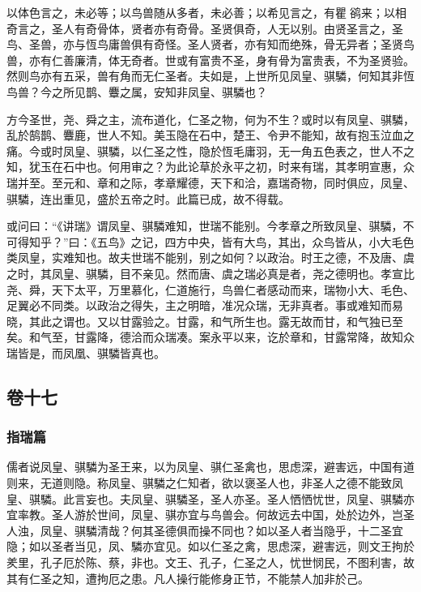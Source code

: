 \documentclass[]{article}
\begin{document}
以体色言之，未必等；以鸟兽随从多者，未必善；以希见言之，有瞿鹆来；以相奇言之，圣人有奇骨体，贤者亦有奇骨。圣贤俱奇，人无以别。由贤圣言之，圣鸟、圣兽，亦与恆鸟庸兽俱有奇怪。圣人贤者，亦有知而绝殊，骨无异者；圣贤鸟兽，亦有仁善廉清，体无奇者。世或有富贵不圣，身有骨为富贵表，不为圣贤验。然则鸟亦有五采，兽有角而无仁圣者。夫如是，上世所见凤皇、骐驎，何知其非恆鸟兽？今之所见鹊、麞之属，安知非凤皇、骐驎也？

方今圣世，尧、舜之主，流布道化，仁圣之物，何为不生？或时以有凤皇、骐驎，乱於鹄鹊、麞鹿，世人不知。美玉隐在石中，楚王、令尹不能知，故有抱玉泣血之痛。今或时凤皇、骐驎，以仁圣之性，隐於恆毛庸羽，无一角五色表之，世人不之知，犹玉在石中也。何用审之？为此论草於永平之初，时来有瑞，其孝明宣惠，众瑞并至。至元和、章和之际，孝章耀德，天下和洽，嘉瑞奇物，同时俱应，凤皇、骐驎，连出重见，盛於五帝之时。此篇已成，故不得载。

或问曰：``《讲瑞》谓凤皇、骐驎难知，世瑞不能别。今孝章之所致凤皇、骐驎，不可得知乎？''曰：《五鸟》之记，四方中央，皆有大鸟，其出，众鸟皆从，小大毛色类凤皇，实难知也。故夫世瑞不能别，别之如何？以政治。时王之德，不及唐、虞之时，其凤皇、骐驎，目不亲见。然而唐、虞之瑞必真是者，尧之德明也。孝宣比尧、舜，天下太平，万里慕化，仁道施行，鸟兽仁者感动而来，瑞物小大、毛色、足翼必不同类。以政治之得失，主之明暗，准况众瑞，无非真者。事或难知而易晓，其此之谓也。又以甘露验之。甘露，和气所生也。露无故而甘，和气独已至矣。和气至，甘露降，德洽而众瑞凑。案永平以来，讫於章和，甘露常降，故知众瑞皆是，而凤凰、骐驎皆真也。

\hypertarget{header-n747}{%
\subsection{卷十七}\label{header-n747}}

\hypertarget{header-n748}{%
\subsubsection{指瑞篇}\label{header-n748}}

儒者说凤皇、骐驎为圣王来，以为凤皇、骐仁圣禽也，思虑深，避害远，中国有道则来，无道则隐。称凤皇、骐驎之仁知者，欲以褒圣人也，非圣人之德不能致凤皇、骐驎。此言妄也。夫凤皇、骐驎圣，圣人亦圣。圣人恓恓忧世，凤皇、骐驎亦宜率教。圣人游於世间，凤皇、骐亦宜与鸟兽会。何故远去中国，处於边外，岂圣人浊，凤皇、骐驎清哉？何其圣德俱而操不同也？如以圣人者当隐乎，十二圣宜隐；如以圣者当见，凤、驎亦宜见。如以仁圣之禽，思虑深，避害远，则文王拘於羑里，孔子厄於陈、蔡，非也。文王、孔子，仁圣之人，忧世悯民，不图利害，故其有仁圣之知，遭拘厄之患。凡人操行能修身正节，不能禁人加非於己。
\end{document}
